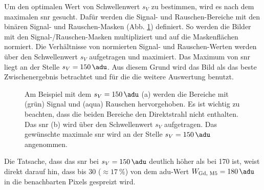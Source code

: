 \noindent
Um den optimalen Wert von Schwellenwert $s_V$ zu bestimmen, wird es nach dem maximalen \gls{snr} gesucht. Dafür werden die Signal- und Rauschen-Bereiche mit den binären Signal- und Rauschen-Masken (Abb. \ref{fig:th_150_mask_snr}) definiert. So werden die Bilder mit den Signal-/Rauschen-Masken multipliziert und auf die Maskenflächen normiert. Die Verhältnisse von normierten Signal- und Rauschen-Werten werden über den Schwellenwert $s_V$ aufgetragen und maximiert. Das Maximum von \gls{snr} liegt an der Stelle $s_V = \SI{150}{\adu}$. Aus diesem Grund wird das Bild als das beste Zwischenergebnis betrachtet und für die die weitere Auswertung benutzt. 
\begin{figure}[H]
    \centering
    
    \caption{Am Beispiel mit dem $s_V = \SI{150}{\adu}$ (a) werden die Bereiche mit (grün) Signal und (aqua) Rauschen hervorgehoben. Es ist wichtig zu beachten, dass die beiden Bereiche den Direktstrahl nicht enthalten. Das \gls{snr} (b) wird über den Schwellenwert $s_V$ aufgetragen. Das gewünschte maximale \gls{snr} wird an der Stelle $s_V = \SI{150}{\adu}$ angenommen.}
    \label{fig:th_150_mask_snr}
\end{figure}
%     
\noindent
Die Tatsache, dass das \gls{snr} bei $s_V = \SI{150}{\adu}$ deutlich höher als bei \SI{170}{\adu} ist, weist direkt darauf hin, dass bis \SI{30}{\adu} ($\approx \SI{17}{\percent}$) von dem \gls{adu}-Wert $W_\text{Gd, M5} = \SI{180}{\adu}$ in die benachbarten Pixels gespreizt wird. 


